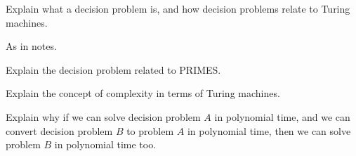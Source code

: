 \documentclass[addpoints,12pt]{exam}
\begin{document}
\begin{questions}
\begin{solution}
\end{solution}


\question
Explain what a decision problem is, and how decision problems relate to Turing machines.
\begin{solution}
As in notes.
\end{solution}


\question
Explain the decision problem related to PRIMES.


\question
Explain the concept of complexity in terms of Turing machines.


\question
Explain why if we can solve decision problem $A$ in polynomial time, and we can convert decision problem $B$ to problem $A$ in polynomial time, then we can solve problem $B$ in polynomial time too.


\end{questions}




\end{document}
